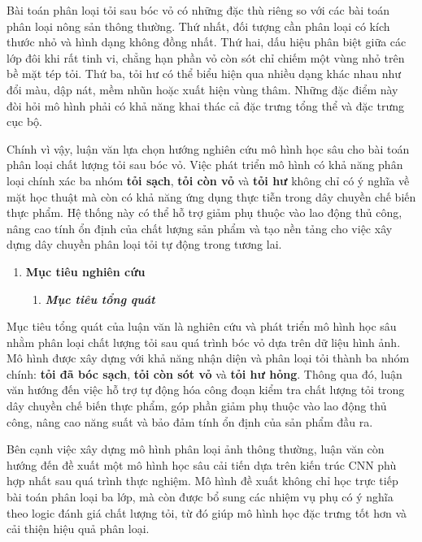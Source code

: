 \documentclass[
]{article}
\begin{document}
Bài toán phân loại tỏi sau bóc vỏ có những đặc thù riêng so với các bài
toán phân loại nông sản thông thường. Thứ nhất, đối tượng cần phân loại
có kích thước nhỏ và hình dạng không đồng nhất. Thứ hai, dấu hiệu phân
biệt giữa các lớp đôi khi rất tinh vi, chẳng hạn phần vỏ còn sót chỉ
chiếm một vùng nhỏ trên bề mặt tép tỏi. Thứ ba, tỏi hư có thể biểu hiện
qua nhiều dạng khác nhau như đổi màu, dập nát, mềm nhũn hoặc xuất hiện
vùng thâm. Những đặc điểm này đòi hỏi mô hình phải có khả năng khai thác
cả đặc trưng tổng thể và đặc trưng cục bộ.

Chính vì vậy, luận văn lựa chọn hướng nghiên cứu mô hình học sâu cho bài
toán phân loại chất lượng tỏi sau bóc vỏ. Việc phát triển mô hình có khả
năng phân loại chính xác ba nhóm \textbf{tỏi sạch}, \textbf{tỏi còn vỏ}
và \textbf{tỏi hư} không chỉ có ý nghĩa về mặt học thuật mà còn có khả
năng ứng dụng thực tiễn trong dây chuyền chế biến thực phẩm. Hệ thống
này có thể hỗ trợ giảm phụ thuộc vào lao động thủ công, nâng cao tính ổn
định của chất lượng sản phẩm và tạo nền tảng cho việc xây dựng dây
chuyền phân loại tỏi tự động trong tương lai.

\begin{enumerate}
\def\labelenumi{\arabic{enumi}.}
\setcounter{enumi}{1}
\item
  \protect{}\label{_Toc232111981}{}\textbf{Mục tiêu nghiên
  cứu}

  \begin{enumerate}
  \def\labelenumii{\arabic{enumii}.}
  \item
    \protect{}\label{_Toc232111982}{}\emph{\textbf{Mục tiêu
    tổng quát}}
  \end{enumerate}
\end{enumerate}

Mục tiêu tổng quát của luận văn là nghiên cứu và phát triển mô hình học
sâu nhằm phân loại chất lượng tỏi sau quá trình bóc vỏ dựa trên dữ liệu
hình ảnh. Mô hình được xây dựng với khả năng nhận diện và phân loại tỏi
thành ba nhóm chính: \textbf{tỏi đã bóc sạch}, \textbf{tỏi còn sót vỏ}
và \textbf{tỏi hư hỏng}. Thông qua đó, luận văn hướng đến việc hỗ trợ tự
động hóa công đoạn kiểm tra chất lượng tỏi trong dây chuyền chế biến
thực phẩm, góp phần giảm phụ thuộc vào lao động thủ công, nâng cao năng
suất và bảo đảm tính ổn định của sản phẩm đầu ra.

Bên cạnh việc xây dựng mô hình phân loại ảnh thông thường, luận văn còn
hướng đến đề xuất một mô hình học sâu cải tiến dựa trên kiến trúc CNN
phù hợp nhất sau quá trình thực nghiệm. Mô hình đề xuất không chỉ học
trực tiếp bài toán phân loại ba lớp, mà còn được bổ sung các nhiệm vụ
phụ có ý nghĩa theo logic đánh giá chất lượng tỏi, từ đó giúp mô hình
học đặc trưng tốt hơn và cải thiện hiệu quả phân loại.
\end{document}
